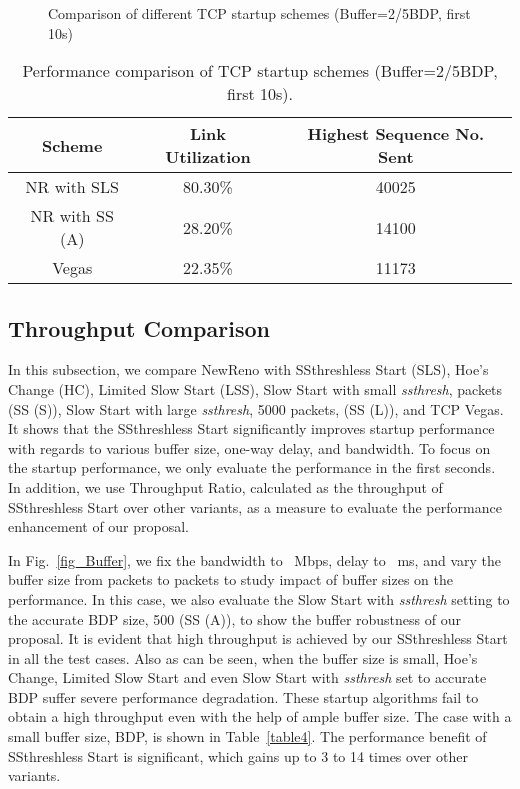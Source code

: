 \documentclass[12pt,onecolumn]{IEEEtran}
\begin{document}
\begin{figure}[t]
 \centering
  \centering
  \caption{Comparison of different TCP startup schemes (Buffer=2/5BDP, first 10s)}
\label{three}
\end{figure}
\begin{table}[h]
\centering
\caption{\footnotesize Performance comparison of TCP startup schemes (Buffer=2/5BDP, first 10s).} \begin{tabular}{|c|c|c|} \hline
Scheme & Link Utilization & Highest Sequence No. Sent\\ \hline \hline
NR with SLS & 80.30\%   & 40025 \\ \hline NR with SS (A) & 28.20\%  & 14100   \\ \hline
Vegas & 22.35\%   & 11173 \\ \hline
\end{tabular}
\label{threetable}
\end{table}

\subsection{Throughput Comparison}

In this subsection, we compare NewReno with SSthreshless Start (SLS), Hoe's
Change (HC), Limited Slow Start (LSS), Slow Start with small \emph{ssthresh},  packets (SS (S)),
Slow Start with large \emph{ssthresh}, 5000 packets, (SS (L)), and TCP
Vegas. It shows that the SSthreshless Start significantly improves startup
performance with regards to various buffer size, one-way delay, and bandwidth.
To focus on the startup performance, we only evaluate the performance in the
first  seconds. In addition, we use Throughput Ratio, calculated as the
throughput of SSthreshless Start over other variants, as a measure to evaluate
the performance enhancement of our proposal.

In Fig.~\ref{fig_Buffer}, we fix the bandwidth to ~Mbps, delay to ~ms,
and vary the buffer size from  packets to  packets to study impact of
buffer sizes on the performance. In this case, we also evaluate the Slow Start
with \emph{ssthresh} setting to the accurate BDP
size, 500 (SS (A)), to show the buffer robustness of our proposal. It is
evident that high throughput is achieved by our SSthreshless Start in all the
test cases. Also as can be seen, when the buffer size is small, Hoe's Change,
Limited Slow Start and even Slow Start with \emph{ssthresh} set to accurate BDP
suffer severe performance degradation. These startup algorithms fail to obtain
a high throughput even with the help of ample buffer size. The case with a
small buffer size,  BDP, is shown in Table~\ref{table4}. The performance
benefit of SSthreshless Start is significant, which gains up to 3 to 14 times
over other variants.
\end{document}
